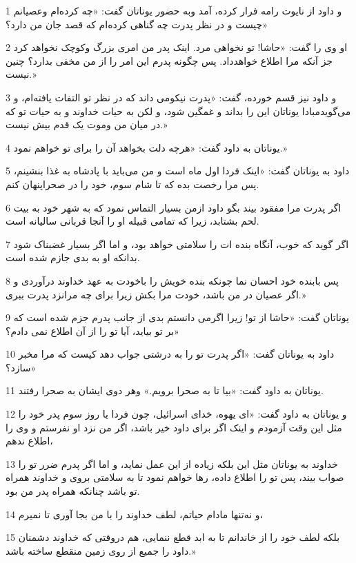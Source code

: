 \par 1 و داود از نایوت رامه فرار کرده، آمد وبه حضور یوناتان گفت: «چه کرده‌ام وعصیانم چیست و در نظر پدرت چه گناهی کرده‌ام که قصد جان من دارد؟»
\par 2 او وی را گفت: «حاشا! تو نخواهی مرد. اینک پدر من امری بزرگ وکوچک نخواهد کرد جز آنکه مرا اطلاع خواهدداد. پس چگونه پدرم این امر را از من مخفی بدارد؟ چنین نیست.»
\par 3 و داود نیز قسم خورده، گفت: «پدرت نیکومی داند که در نظر تو التفات یافته‌ام، و می‌گویدمبادا یوناتان این را بداند و غمگین شود، و لکن به حیات خداوند و به حیات تو که در میان من وموت یک قدم بیش نیست.»
\par 4 یوناتان به داود گفت: «هر‌چه دلت بخواهد آن را برای تو خواهم نمود.»
\par 5 داود به یوناتان گفت: «اینک فردا اول ماه است و من می‌باید با پادشاه به غذا بنشینم، پس مرا رخصت بده که تا شام سوم، خود را در صحراپنهان کنم.
\par 6 اگر پدرت مرا مفقود بیند بگو داود ازمن بسیار التماس نمود که به شهر خود به بیت لحم بشتابد، زیرا که تمامی قبیله او را آنجا قربانی سالیانه است.
\par 7 اگر گوید که خوب، آنگاه بنده ات را سلامتی خواهد بود، و اما اگر بسیار غضبناک شود بدانکه او به بدی جازم شده است.
\par 8 پس بابنده خود احسان نما چونکه بنده خویش را باخودت به عهد خداوند در‌آوردی و اگر عصیان در من باشد، خودت مرا بکش زیرا برای چه مرانزد پدرت ببری.»
\par 9 یوناتان گفت: «حاشا از تو! زیرا اگرمی دانستم بدی از جانب پدرم جزم شده است که بر تو بیاید، آیا تو را از آن اطلاع نمی دادم؟»
\par 10 داود به یوناتان گفت: «اگر پدرت تو را به درشتی جواب دهد کیست که مرا مخبر سازد؟»
\par 11 یوناتان به داود گفت: «بیا تا به صحرا برویم.» وهر دوی ایشان به صحرا رفتند.
\par 12 و یوناتان به داود گفت: «ای یهوه، خدای اسرائیل، چون فردا یا روز سوم پدر خود را مثل این وقت آزمودم و اینک اگر برای داود خیر باشد، اگر من نزد او نفرستم و وی را اطلاع ندهم،
\par 13 خداوند به یوناتان مثل این بلکه زیاده از این عمل نماید، و اما اگر پدرم ضرر تو را صواب بیند، پس تو را اطلاع داده، رها خواهم نمود تا به سلامتی بروی و خداوند همراه تو باشد چنانکه همراه پدر من بود.
\par 14 و نه‌تنها مادام حیاتم، لطف خداوند را با من بجا آوری تا نمیرم،
\par 15 بلکه لطف خود را از خاندانم تا به ابد قطع ننمایی، هم دروقتی که خداوند دشمنان داود را جمیع از روی زمین منقطع ساخته باشد.»
